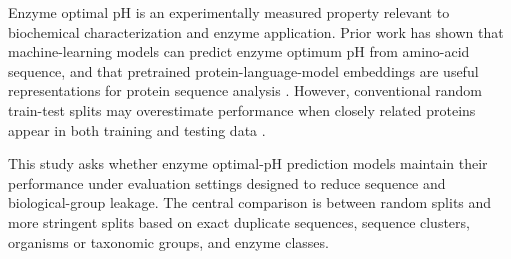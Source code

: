 Enzyme optimal pH is an experimentally measured property relevant to biochemical characterization and enzyme application. Prior work has shown that machine-learning models can predict enzyme optimum pH from amino-acid sequence, and that pretrained protein-language-model embeddings are useful representations for protein sequence analysis \cite{gado2025machine,rives2021biological,lin2023evolutionary,elnaggar2022prottrans}. However, conventional random train-test splits may overestimate performance when closely related proteins appear in both training and testing data \cite{hou2022ten,teufel2023graphpart}.

This study asks whether enzyme optimal-pH prediction models maintain their performance under evaluation settings designed to reduce sequence and biological-group leakage. The central comparison is between random splits and more stringent splits based on exact duplicate sequences, sequence clusters, organisms or taxonomic groups, and enzyme classes.
